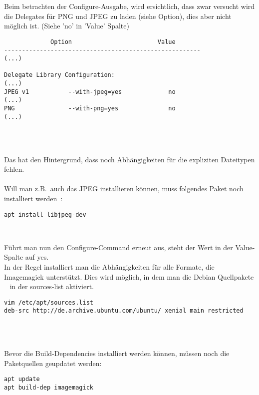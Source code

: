 Beim betrachten der Configure-Ausgabe, wird ersichtlich,
dass zwar versucht wird die Delegates für PNG und JPEG zu laden (siehe Option),
dies aber nicht möglich ist. (Siehe 'no' in 'Value' Spalte)

\begin{verbatim}
             Option                        Value
-------------------------------------------------------
(...)

Delegate Library Configuration:
(...)
JPEG v1           --with-jpeg=yes             no
(...)
PNG               --with-png=yes              no
(...)
\end{verbatim}\\\\
\vspace{5mm}

Das hat den Hintergrund, dass noch Abhängigkeiten für die expliziten Dateitypen fehlen.\\\\

Will man z.B.\ auch das JPEG installieren können, muss folgendes Paket noch installiert werden~\cite{ImageMagickPNGDelegate}:
\begin{verbatim}
apt install libjpeg-dev
\end{verbatim}\\
\vspace{5mm}

Führt man nun den Configure-Command erneut aus, steht der Wert in der Value-Spalte auf yes.\\

In der Regel installiert man die Abhängigkeiten für alle Formate, die Imagemagick unterstützt.
Dies wird möglich, in dem man die Debian Quellpakete
~\cite{DateiEtcApt} in der sources-list aktiviert.~\cite{HowInstallImageMagick}\\

\begin{verbatim}
vim /etc/apt/sources.list
deb-src http://de.archive.ubuntu.com/ubuntu/ xenial main restricted
\end{verbatim}\\\\
\vspace{5mm}

Bevor die Build-Dependencies installiert werden können, müssen noch die Paketquellen geupdatet werden:
\begin{verbatim}
apt update
apt build-dep imagemagick
\end{verbatim}\\\\
\vspace{5mm}

